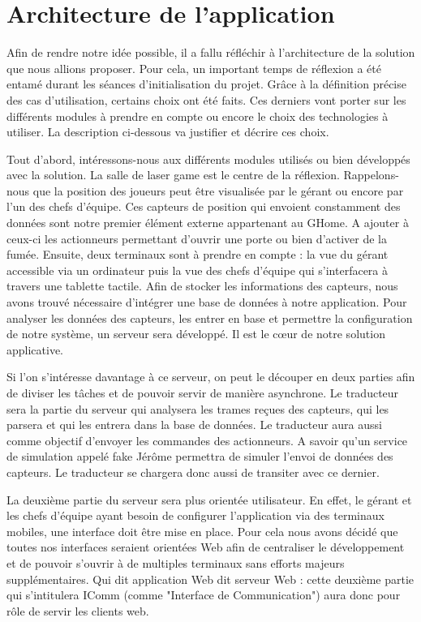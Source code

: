 \section{Architecture de l'application}

Afin de rendre notre idée possible, il a fallu réfléchir à l'architecture de la solution que nous allions proposer. Pour cela, un important temps de réflexion a été entamé durant les séances d'initialisation du projet. Grâce à la définition précise des cas d'utilisation, certains choix ont été faits. Ces derniers vont porter sur les différents modules à prendre en compte ou encore le choix des technologies à utiliser. La description ci-dessous va justifier et décrire ces choix.

Tout d'abord, intéressons-nous aux différents modules utilisés ou bien développés avec la solution. La salle de laser game est le centre de la réflexion. Rappelons-nous que la position des joueurs peut être visualisée par le gérant ou encore par l'un des chefs d'équipe. Ces capteurs de position qui envoient constamment des données sont notre premier élément externe appartenant au GHome. A ajouter à ceux-ci les actionneurs permettant d'ouvrir une porte ou bien d'activer de la fumée. Ensuite, deux terminaux sont à prendre en compte : la vue du gérant accessible via un ordinateur puis la vue des chefs d'équipe qui s'interfacera à travers une tablette tactile. Afin de stocker les informations des capteurs, nous avons trouvé nécessaire d'intégrer une base de données à notre application. Pour analyser les données des capteurs, les entrer en base et permettre la configuration de notre système, un serveur sera développé. Il est le cœur de notre solution applicative.

Si l'on s'intéresse davantage à ce serveur, on peut le découper en deux parties afin de diviser les tâches et de pouvoir servir de manière asynchrone. Le traducteur sera la partie du serveur qui analysera les trames reçues des capteurs, qui les parsera et qui les entrera dans la base de données. Le traducteur aura aussi comme objectif d'envoyer les commandes des actionneurs. A savoir qu'un service de simulation appelé fake Jérôme permettra de simuler l'envoi de données des capteurs. Le traducteur se chargera donc aussi de transiter avec ce dernier.

La deuxième partie du serveur sera plus orientée utilisateur. En effet, le gérant et les chefs d'équipe ayant besoin de configurer l'application via des terminaux mobiles, une interface doit être mise en place. Pour cela nous avons décidé que toutes nos interfaces seraient orientées Web afin de centraliser le développement et de pouvoir s'ouvrir à de multiples terminaux sans efforts majeurs supplémentaires. Qui dit application Web dit serveur Web : cette deuxième partie qui s'intitulera IComm (comme "Interface de Communication") aura donc pour rôle de servir les clients web.

